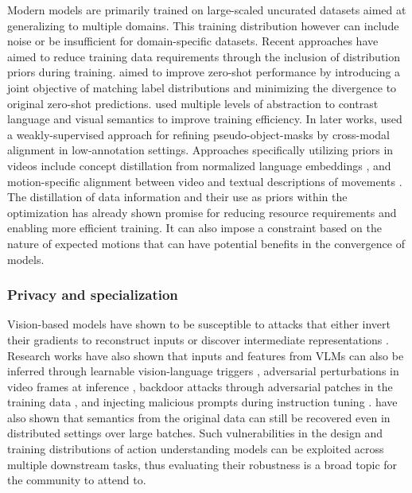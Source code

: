 Modern models are primarily trained on large-scaled uncurated datasets aimed at generalizing to multiple domains. This training distribution however can include noise or be insufficient for domain-specific datasets. Recent approaches have aimed to reduce training data requirements through the inclusion of distribution priors during training. \citet{kahana2022improving} aimed to improve zero-shot performance by introducing a joint objective of matching label distributions and minimizing the divergence to original zero-shot predictions. \citet{gao2022pyramidclip} used multiple levels of abstraction to contrast language and visual semantics to improve training efficiency. In later works, \citet{nag2024safari} used a weakly-supervised approach for refining pseudo-object-masks by cross-modal alignment in low-annotation settings. Approaches specifically utilizing priors in videos include concept distillation from normalized language embeddings \citep{ranasinghe2023language}, and motion-specific alignment between video and textual descriptions of movements \citep{zhang2024enhanced}. The distillation of data information and their use as priors within the optimization has already shown promise for reducing resource requirements and enabling more efficient training. It can also impose a constraint based on the nature of expected motions that can have potential benefits in the convergence of models.


\subsubsection{Privacy and specialization}


Vision-based models have shown to be susceptible to attacks that either invert their gradients to reconstruct inputs \citep{hatamizadeh2022gradvit} or discover intermediate representations \citep{fang2023gifd}. Research works have also shown that inputs and features from VLMs can also be inferred through learnable vision-language triggers \citep{bai2024badclip}, adversarial perturbations in video frames at inference \citep{li2024fmm}, backdoor attacks through adversarial patches in the training data \citep{carlini2022poisoning}, and injecting malicious prompts during instruction tuning \citep{liang2024vl}. \citet{kariyappa2023cocktail} have also shown that semantics from the original data can still be recovered even in distributed settings over large batches. Such vulnerabilities in the design and training distributions of action understanding models can be exploited across multiple downstream tasks, thus evaluating their robustness is a broad topic for the community to attend to.

